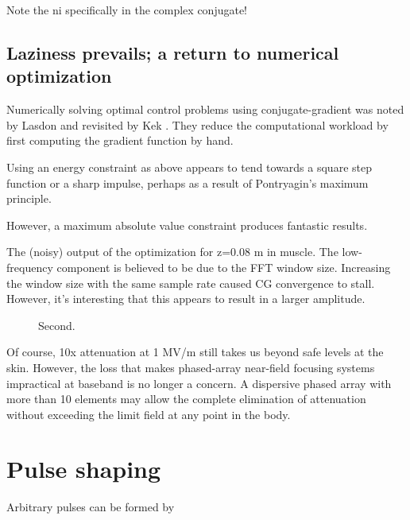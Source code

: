 \documentclass[paper.tex]{subfiles}
\begin{document}
Note the ni specifically in the complex conjugate!


\subsection{Laziness prevails; a return to numerical optimization}

Numerically solving optimal control problems using conjugate-gradient was noted by Lasdon \cite{conjugate1967} and 
revisited by Kek \cite{Conjugate}. They reduce the computational workload by first computing the 
gradient function by hand.

Using an energy constraint as above appears to tend towards a square step function or a sharp impulse, perhaps as a result of Pontryagin's maximum principle\cite{Optimum1964}.


However, a maximum absolute value constraint produces fantastic results.


\begin{figure}[H]
	
	\caption{}
\end{figure}


The (noisy) output of the optimization for z=0.08 m in muscle. The low-frequency component is believed to be due to the FFT window size. Increasing the window size with the same sample rate caused CG convergence to stall. However, it's interesting that this appears to result in a larger amplitude. 


\begin{figure}[H]
	
	\caption{Second.}
\end{figure}



Of course, 10x attenuation at 1 MV/m still takes us beyond safe levels at the skin. However, the loss that makes phased-array near-field focusing systems impractical at baseband is no longer a concern. A dispersive phased array with more than 10 elements may allow the complete elimination of attenuation without exceeding the limit field at any point in the body. 


\section{Pulse shaping}


Arbitrary pulses can be formed by 
\end{document}
